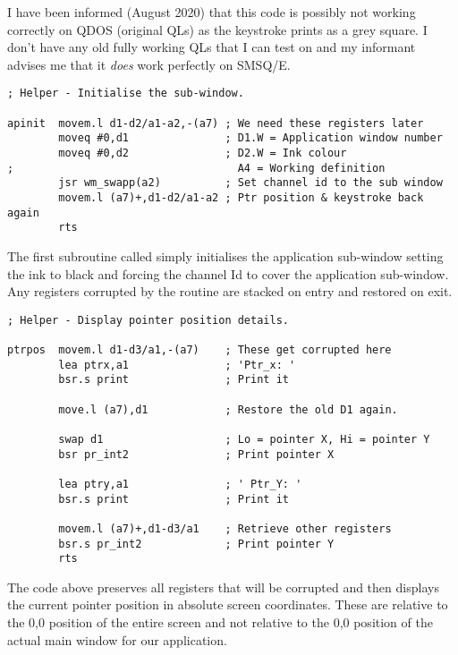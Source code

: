 \begin{note}
I have been informed (August 2020) that this code is possibly not working correctly on QDOS (original QLs) as the keystroke prints as a grey square. I don't have any old fully working QLs that I can test on and my informant advises me that it \emph{does} work perfectly on SMSQ/E. 
\end{note}

\begin{lstlisting}[firstnumber=1,]
; Helper - Initialise the sub-window.

apinit  movem.l d1-d2/a1-a2,-(a7) ; We need these registers later
        moveq #0,d1               ; D1.W = Application window number
        moveq #0,d2               ; D2.W = Ink colour
;                                   A4 = Working definition
        jsr wm_swapp(a2)          ; Set channel id to the sub window
        movem.l (a7)+,d1-d2/a1-a2 ; Ptr position & keystroke back again
        rts
\end{lstlisting}

The first subroutine called simply initialises the application sub-{}window
        setting the ink to black and forcing the channel Id to cover the application
        sub-{}window. Any registers corrupted by the routine are stacked on entry and
        restored on exit.

\begin{lstlisting}[firstnumber=1,]
; Helper - Display pointer position details.

ptrpos  movem.l d1-d3/a1,-(a7)    ; These get corrupted here
        lea ptrx,a1               ; 'Ptr_x: '
        bsr.s print               ; Print it

        move.l (a7),d1            ; Restore the old D1 again.

        swap d1                   ; Lo = pointer X, Hi = pointer Y 
        bsr pr_int2               ; Print pointer X

        lea ptry,a1               ; ' Ptr_Y: '
        bsr.s print               ; Print it

        movem.l (a7)+,d1-d3/a1    ; Retrieve other registers
        bsr.s pr_int2             ; Print pointer Y
        rts
\end{lstlisting}

The code above preserves all registers that will be corrupted and then
        displays the current pointer position in absolute screen coordinates. These are
        relative to the 0,0 position of the entire screen and not relative to the 0,0
        position of the actual main window for our application. 

